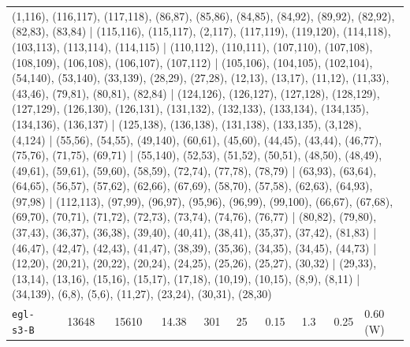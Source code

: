 \begin{longtable}{lrrrrrrrrl}
\multicolumn{10}{p{0.96\linewidth}}{\tiny\raggedright\arraybackslash (1,116), (116,117), (117,118), (86,87), (85,86), (84,85), (84,92), (89,92), (82,92), (82,83), (83,84) | (115,116), (115,117), (2,117), (117,119), (119,120), (114,118), (103,113), (113,114), (114,115) | (110,112), (110,111), (107,110), (107,108), (108,109), (106,108), (106,107), (107,112) | (105,106), (104,105), (102,104), (54,140), (53,140), (33,139), (28,29), (27,28), (12,13), (13,17), (11,12), (11,33), (43,46), (79,81), (80,81), (82,84) | (124,126), (126,127), (127,128), (128,129), (127,129), (126,130), (126,131), (131,132), (132,133), (133,134), (134,135), (134,136), (136,137) | (125,138), (136,138), (131,138), (133,135), (3,128), (4,124) | (55,56), (54,55), (49,140), (60,61), (45,60), (44,45), (43,44), (46,77), (75,76), (71,75), (69,71) | (55,140), (52,53), (51,52), (50,51), (48,50), (48,49), (49,61), (59,61), (59,60), (58,59), (72,74), (77,78), (78,79) | (63,93), (63,64), (64,65), (56,57), (57,62), (62,66), (67,69), (58,70), (57,58), (62,63), (64,93), (97,98) | (112,113), (97,99), (96,97), (95,96), (96,99), (99,100), (66,67), (67,68), (69,70), (70,71), (71,72), (72,73), (73,74), (74,76), (76,77) | (80,82), (79,80), (37,43), (36,37), (36,38), (39,40), (40,41), (38,41), (35,37), (37,42), (81,83) | (46,47), (42,47), (42,43), (41,47), (38,39), (35,36), (34,35), (34,45), (44,73) | (12,20), (20,21), (20,22), (20,24), (24,25), (25,26), (25,27), (30,32) | (29,33), (13,14), (13,16), (15,16), (15,17), (17,18), (10,19), (10,15), (8,9), (8,11) | (34,139), (6,8), (5,6), (11,27), (23,24), (30,31), (28,30)} \\[2pt]
\texttt{egl-s3-B} & 13648 & 15610 & 14.38 & 301 & 25 & 0.15 & 1.3 & 0.25 & 0.60\,(W) \\

\end{longtable}
